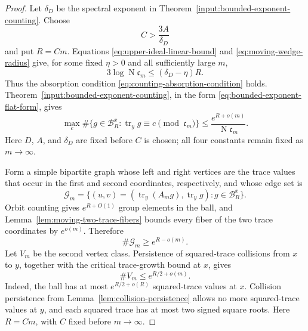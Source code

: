 \documentclass[11pt,reqno]{amsart}
\theoremstyle{definition}
\theoremstyle{remark}
\newcommand{\cB}{\mathcal B}
\newcommand{\cG}{\mathcal G}
\newcommand{\Tr}{\operatorname{tr}}
\newcommand{\Norm}{\operatorname{N}}
\begin{document}
\begin{proof}
Let \(\delta_D\) be the spectral exponent in
Theorem~\ref{input:bounded-exponent-counting}.  Choose
\begin{equation}\label{eq:moving-wedge-radius}
 C>\frac{3A}{\delta_D}
\end{equation}
and put \(R=Cm\).  Equations
\eqref{eq:upper-ideal-linear-bound} and
\eqref{eq:moving-wedge-radius} give, for some fixed \(\eta>0\) and all
sufficiently large \(m\),
\[
 3\log\Norm\mathfrak c_m\le(\delta_D-\eta)R.
\]
Thus the absorption condition
\eqref{eq:counting-absorption-condition} holds.
Theorem~\ref{input:bounded-exponent-counting}, in the form
\eqref{eq:bounded-exponent-flat-form}, gives
\begin{equation}\label{eq:ball-flatness}
 \max_c\#\{g\in\cB_R^x:\Tr_y g\equiv c
                    \pmod{\mathfrak c_m}\}
 \le\frac{e^{R+o(m)}}{\Norm\mathfrak c_m}.
\end{equation}
Here \(D\), \(A\), and \(\delta_D\) are fixed before \(C\) is chosen;
all four constants remain fixed as \(m\to\infty\).

Form a simple bipartite graph whose left and right vertices are the trace
values that occur in the first and second coordinates, respectively, and
whose edge set is
\begin{equation}\label{eq:moving-trace-graph}
 \cG_m=\{(u,v)=(\Tr_y(A_mg),\Tr_y g):g\in\cB_R^x\}.
\end{equation}
Orbit counting gives \(e^{R+O(1)}\) group elements in the ball, and
Lemma~\ref{lem:moving-two-trace-fibers} bounds every fiber of the two trace
coordinates by \(e^{o(m)}\).  Therefore
\begin{equation}\label{eq:graph-edges}
 \#\cG_m\ge e^{R-o(m)}.
\end{equation}
Let \(V_m\) be the second vertex class.  Persistence of squared-trace
collisions from \(x\) to \(y\), together with the critical trace-growth
bound at \(x\), gives
\begin{equation}\label{eq:V-size}
 \#V_m\le e^{R/2+o(m)}.
\end{equation}
Indeed, the ball has at most \(e^{R/2+o(R)}\) squared-trace values at \(x\).
Collision persistence from Lemma~\ref{lem:collision-persistence} allows no
more squared-trace values at \(y\), and each squared trace has at most two
signed square roots.  Here \(R=Cm\), with \(C\) fixed before
\(m\to\infty\).


\end{proof}
\end{document}
